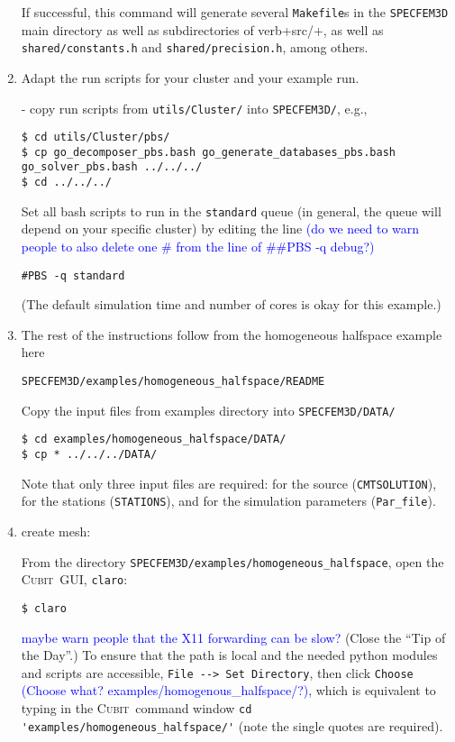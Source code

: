 \documentclass[10pt,fleqn,letterpaper]{article}
\newcommand{\cubit}{\textsc{Cubit}}
\begin{document}
\begin{enumerate}
If successful, this command will generate several \verb+Makefile+s in the \verb+SPECFEM3D+ main directory as well as subdirectories of verb+src/+, as well as \verb+shared/constants.h+ and \verb+shared/precision.h+, among others.

\item Adapt the run scripts for your cluster and your example run.

- copy run scripts from \verb+utils/Cluster/+ into \verb+SPECFEM3D/+, e.g.,
\begin{lstlisting}
$ cd utils/Cluster/pbs/
$ cp go_decomposer_pbs.bash go_generate_databases_pbs.bash go_solver_pbs.bash ../../../
$ cd ../../../
\end{lstlisting}

Set all bash scripts to run in the \verb+standard+ queue (in general, the queue will depend on your specific cluster) by editing the line
\textcolor{blue}{(do we need to warn people to also delete one \# from the line of \#\#PBS -q debug?)}
\begin{lstlisting}
#PBS -q standard
\end{lstlisting}
(The default simulation time and number of cores is okay for this example.)
 
\item The rest of the instructions follow from the homogeneous halfspace example here
\begin{lstlisting}
SPECFEM3D/examples/homogeneous_halfspace/README
\end{lstlisting}

Copy the input files from examples directory into \verb+SPECFEM3D/DATA/+
\begin{lstlisting}
$ cd examples/homogeneous_halfspace/DATA/
$ cp * ../../../DATA/
\end{lstlisting}
%
Note that only three input files are required: for the source (\verb+CMTSOLUTION+), for the stations (\verb+STATIONS+), and for the simulation parameters (\verb+Par_file+).

\item create mesh:

From the directory \verb+SPECFEM3D/examples/homogeneous_halfspace+, open the \cubit\ GUI, \verb+claro+:
\begin{lstlisting}
$ claro
\end{lstlisting}
\textcolor{blue}{maybe warn people that the X11 forwarding can be slow?}
%
(Close the ``Tip of the Day''.)
To ensure that the path is local and the needed python modules and scripts are accessible, \verb+File --> Set Directory+, then click \verb+Choose+  \textcolor{blue}{(Choose what? examples/homogenous\_halfspace/?)}, which is equivalent to typing in the \cubit\ command window \verb+cd 'examples/homogeneous_halfspace/'+ (note the single quotes are required).


\end{enumerate}
\end{document}
